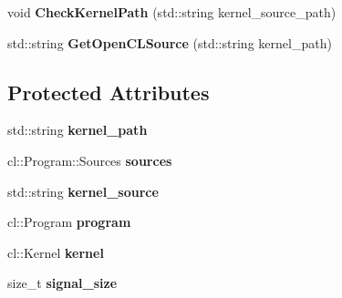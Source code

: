 \begin{DoxyCompactItemize}
\item 
void {\bfseries Check\+Kernel\+Path} (std\+::string kernel\+\_\+source\+\_\+path)\hypertarget{classjaspl_1_1ocl_1_1_task_item_af048f07b953902e9ac048fb32dc86535}{}\label{classjaspl_1_1ocl_1_1_task_item_af048f07b953902e9ac048fb32dc86535}

\item 
std\+::string {\bfseries Get\+Open\+C\+L\+Source} (std\+::string kernel\+\_\+path)\hypertarget{classjaspl_1_1ocl_1_1_task_item_a015a0fc3c5fe671b6f9d529a77cb4132}{}\label{classjaspl_1_1ocl_1_1_task_item_a015a0fc3c5fe671b6f9d529a77cb4132}

\end{DoxyCompactItemize}
\subsection*{Protected Attributes}
\begin{DoxyCompactItemize}
\item 
std\+::string {\bfseries kernel\+\_\+path}\hypertarget{classjaspl_1_1ocl_1_1_task_item_aa08a1b3eaff97acd4083d81de0d78de9}{}\label{classjaspl_1_1ocl_1_1_task_item_aa08a1b3eaff97acd4083d81de0d78de9}

\item 
cl\+::\+Program\+::\+Sources {\bfseries sources}\hypertarget{classjaspl_1_1ocl_1_1_task_item_acf5a7b33791d535255f524dd7bdafa2d}{}\label{classjaspl_1_1ocl_1_1_task_item_acf5a7b33791d535255f524dd7bdafa2d}

\item 
std\+::string {\bfseries kernel\+\_\+source}\hypertarget{classjaspl_1_1ocl_1_1_task_item_a90439204dd331c6a4f488e3c6016ddfa}{}\label{classjaspl_1_1ocl_1_1_task_item_a90439204dd331c6a4f488e3c6016ddfa}

\item 
cl\+::\+Program {\bfseries program}\hypertarget{classjaspl_1_1ocl_1_1_task_item_afd9f6878a4a075d6fbc9cb2a74f3ac2e}{}\label{classjaspl_1_1ocl_1_1_task_item_afd9f6878a4a075d6fbc9cb2a74f3ac2e}

\item 
cl\+::\+Kernel {\bfseries kernel}\hypertarget{classjaspl_1_1ocl_1_1_task_item_ab628ae818420624811dee92ce68615fd}{}\label{classjaspl_1_1ocl_1_1_task_item_ab628ae818420624811dee92ce68615fd}

\item 
size\+\_\+t {\bfseries signal\+\_\+size}\hypertarget{classjaspl_1_1ocl_1_1_task_item_a8a21af3a15a0010ae139cc6b0555c380}{}\label{classjaspl_1_1ocl_1_1_task_item_a8a21af3a15a0010ae139cc6b0555c380}

\end{DoxyCompactItemize}
